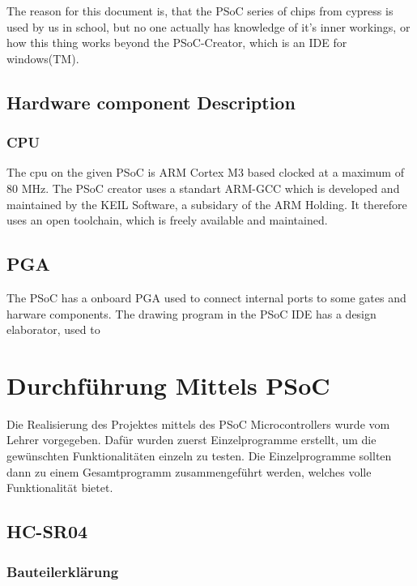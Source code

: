 \documentclass[12pt,a4paper]{article}
\begin{document}
The reason for this document is, that the PSoC series of chips from cypress is
used by us in school, but no one actually has knowledge of it's inner workings,
or how this thing works beyond the PSoC-Creator, which is an IDE for 
windows(TM).

\subsection{Hardware component Description}

\subsubsection{CPU}

The cpu on the given PSoC is ARM Cortex M3 based clocked at a maximum of 80 MHz.
The PSoC creator uses a standart ARM-GCC which is developed and maintained by
the KEIL Software, a subsidary of the ARM Holding. It therefore uses an open
toolchain, which is freely available and maintained.

\subsection{PGA}

The PSoC has a onboard PGA used to connect internal ports to some gates and
harware components. The drawing program in the PSoC IDE has a design elaborator,
used to 


\fi

\section{Durchführung Mittels PSoC}

	Die Realisierung des Projektes mittels des PSoC Microcontrollers wurde
	vom Lehrer vorgegeben. Dafür wurden zuerst Einzelprogramme erstellt,
	um die gewünschten Funktionalitäten einzeln zu testen. Die
	Einzelprogramme sollten dann zu einem Gesamtprogramm zusammengeführt
	werden, welches volle Funktionalität bietet.

\subsection{HC-SR04}

\subsubsection{Bauteilerklärung}
	
\end{document}
